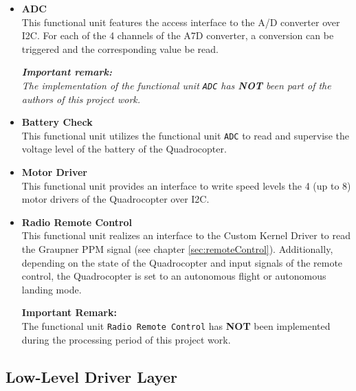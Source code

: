 \begin{itemize}
	\item \textbf{ADC}\\
	This functional unit features the access interface to the A/D converter over I2C. For each of the 4 channels of the A7D converter, a conversion can be triggered and the corresponding value be read.
	
	\textit{\textbf{Important remark:}\\
	The implementation of the functional unit \texttt{ADC} has \textbf{NOT} been part of the authors of this project work.}
	
	\item \textbf{Battery Check}\\
	This functional unit utilizes the functional unit \texttt{ADC} to read and supervise the voltage level of the battery of the Quadrocopter.
	
	\item \textbf{Motor Driver}\\
	This functional unit provides an interface to write speed levels the 4 (up to 8) motor drivers of the Quadrocopter over I2C.
	
	\item \textbf{Radio Remote Control}\\
	This functional unit realizes an interface to the Custom Kernel Driver to read the Graupner PPM signal (see chapter \ref{sec:remoteControl}). Additionally, depending on the state of the Quadrocopter and input signals of the remote control, the Quadrocopter is set to an autonomous flight or autonomous landing mode.
	
	\textbf{Important Remark:}\\
	The functional unit \texttt{Radio Remote Control} has \textbf{NOT} been implemented during the processing period of this project work. 
	
\end{itemize}

\subsection{Low-Level Driver Layer}
\label{sec:software:funcUnits:lld}

